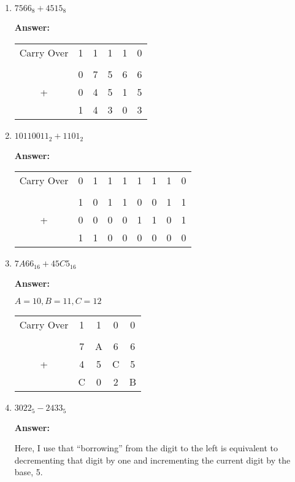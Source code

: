 \documentclass[12pt]{extreport}
\newcommand{\answer}[0]{\medskip \textbf{Answer:} \medskip}
\begin{document}
\begin{enumerate}
    
    \item \( 7566_{8} + 4515_{8} \)
    
        \answer

        \begin{tabular}{cccccc}
            Carry Over & 1& 1& 1& 1& 0 \\
            \\
                       & 0& 7& 5& 6& 6 \\
            +          & 0& 4& 5& 1& 5 \\
            \hline
                       & 1& 4& 3& 0& 3
        \end{tabular}

    \item \( 10110011_{2} + 1101_{2} \)
    
        \answer

        \begin{tabular}{ccccccccc}
            Carry Over &0& 1& 1& 1& 1& 1& 1& 0 \\
            \\
            & 1& 0& 1& 1& 0& 0& 1& 1 \\
            + & 0& 0& 0& 0& 1& 1& 0& 1 \\
            \hline
            & 1& 1& 0& 0& 0& 0& 0& 0
        \end{tabular}

    \item \( 7A66_{16} + 45C5_{16} \)
    
        \answer

        \( A = 10, B = 11, C = 12 \)

        \begin{tabular}{ccccc}
            Carry Over &1& 1& 0& 0 \\
            \\
            & 7& A& 6& 6 \\
            + & 4& 5& C& 5 \\
            \hline
            & C& 0& 2& B
        \end{tabular}

    \item \( 3022_{5} - 2433_{5} \)
    
        \answer

        Here, I use that ``borrowing'' from the digit to the left is equivalent to decrementing that digit by one and incrementing the current digit by the base, 5.


\end{enumerate}
\end{document}
